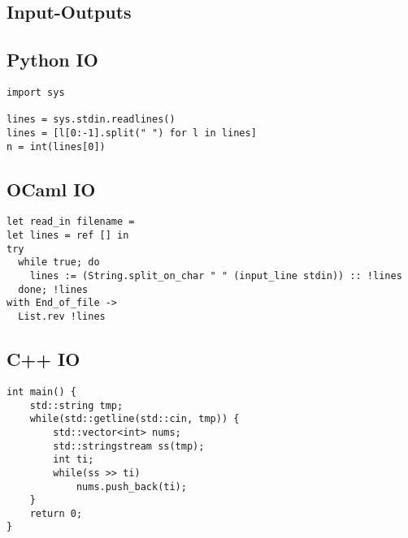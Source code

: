 \documentclass[10pt,a4paper]{article}
\begin{document}
\begin{landscape}
\begin{multicols}{2}


\section{Input-Outputs}

\subsection{Python IO}

\lstset{style=py}

\begin{lstlisting}
import sys

lines = sys.stdin.readlines()
lines = [l[0:-1].split(" ") for l in lines]
n = int(lines[0])
\end{lstlisting}

\subsection{OCaml IO}

\lstset{style=ocaml}

\begin{lstlisting}
let read_in filename = 
let lines = ref [] in
try
  while true; do
    lines := (String.split_on_char " " (input_line stdin)) :: !lines
  done; !lines
with End_of_file ->
  List.rev !lines
\end{lstlisting}

\subsection{C++ IO}

\begin{lstlisting}
int main() {
    std::string tmp;
    while(std::getline(std::cin, tmp)) {
        std::vector<int> nums;
        std::stringstream ss(tmp);
        int ti;
        while(ss >> ti) 
            nums.push_back(ti);
    }
    return 0;
}
\end{lstlisting}

\lstset{style=cpp}

\end{multicols}
\end{landscape}
\end{document}
